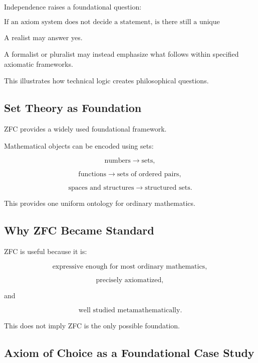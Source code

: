 Independence raises a foundational question:

\[
\boxed{
\text{If an axiom system does not decide a statement, is there still a
unique mathematical truth about it?}
}
\]

A realist may answer yes.

A formalist or pluralist may instead emphasize what follows within specified
axiomatic frameworks.

This illustrates how technical logic creates philosophical questions.

\subsection{Set Theory as Foundation}
\label{subsec:set-theory-as-foundation}

ZFC provides a widely used foundational framework.

Mathematical objects can be encoded using sets:

\[
\boxed{
\text{numbers}
\rightarrow
\text{sets},
}
\]

\[
\boxed{
\text{functions}
\rightarrow
\text{sets of ordered pairs},
}
\]

\[
\boxed{
\text{spaces and structures}
\rightarrow
\text{structured sets}.
}
\]

This provides one uniform ontology for ordinary mathematics.

\subsection{Why ZFC Became Standard}
\label{subsec:why-zfc-standard}

ZFC is useful because it is:

\[
\boxed{
\text{expressive enough for most ordinary mathematics},
}
\]

\[
\boxed{
\text{precisely axiomatized},
}
\]

and

\[
\boxed{
\text{well studied metamathematically}.
}
\]

This does not imply ZFC is the only possible foundation.

\subsection{Axiom of Choice as a Foundational Case Study}
\label{subsec:choice-foundational-case}

